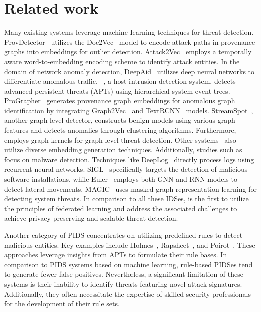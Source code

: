 \section{Related work}
\label{s:relwk}



 Many existing systems leverage machine learning techniques for threat detection. ProvDetector~\cite{provdetector2020} utilizes the Doc2Vec~\cite{le2014distributed} model to encode attack paths in provenance graphs into embeddings for outlier detection. Attack2Vec~\cite{shen2019attack2vec} employs a temporally aware word-to-embedding encoding scheme to identify attack entities. In the domain of network anomaly detection, DeepAid~\cite{deepaid} utilizes deep neural networks to differentiate anomalous traffic. \disdet~\cite{dong2023distdet}, a host intrusion detection system, detects advanced persistent threats (APTs) using hierarchical system event trees. ProGrapher~\cite{yangprographer} generates provenance graph embeddings for anomalous graph identification by integrating Graph2Vec~\cite{narayanan2017graph2vec} and TextRCNN~\cite{lai2015recurrent} models. StreamSpot~\cite{streamspot}, another graph-level detector, constructs benign models using various graph features and detects anomalies through clustering algorithms. Furthermore, \unicorn~\cite{han2020unicorn} employs graph kernels for graph-level threat detection. Other systems~\cite{aljawarneh2018anomaly, maseer2021benchmarking, gyanchandani2012taxonomy,atlas} also utilize diverse embedding generation techniques. Additionally, studies such as \cite{zolkipli2011approach, chakkaravarthy2019survey, isohara2011kernel} focus on malware detection. Techniques like DeepLog~\cite{deeplog2017} directly process logs using recurrent neural networks. SIGL~\cite{sigl} specifically targets the detection of malicious software installations, while Euler~\cite{king2022euler} employs both GNN and RNN models to detect lateral movements. MAGIC~\cite{jia2023magic} uses masked graph representation learning for detecting system threats. In comparison to all these IDSes, \Sys is the first to utilize the principles of federated learning and address the associated challenges to achieve privacy-preserving and scalable threat detection.

 Another category of PIDS concentrates on utilizing predefined rules to detect malicious entities. Key examples include Holmes~\cite{holmes2019}, Rapsheet~\cite{rapsheet2020}, and Poirot~\cite{poirot2019}. These approaches leverage insights from APTs to formulate their rule bases. In comparison to PIDS systems based on machine learning, rule-based PIDSes tend to generate fewer false positives. Nevertheless, a significant limitation of these systems is their inability to identify threats featuring novel attack signatures. Additionally, they often necessitate the expertise of skilled security professionals for the development of their rule sets.

